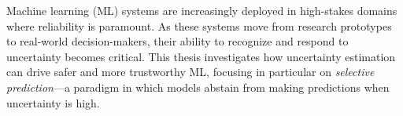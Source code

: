 



\noindent Machine learning (ML) systems are increasingly deployed in high-stakes domains where reliability is paramount. As these systems move from research prototypes to real-world decision-makers, their ability to recognize and respond to uncertainty becomes critical. This thesis investigates how uncertainty estimation can drive safer and more trustworthy ML, focusing in particular on \emph{selective prediction}—a paradigm in which models abstain from making predictions when uncertainty is high.

